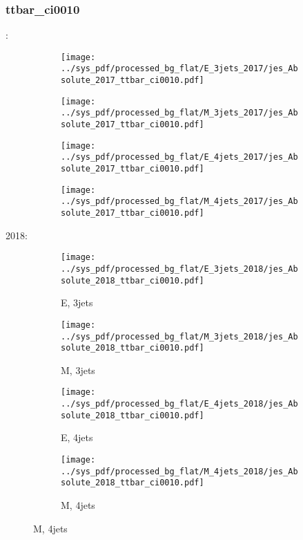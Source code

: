 \documentclass{beamer}
\begin{document}
\begin{frame}
\frametitle{ttbar_ci0010}
\fontsize{5}{1}:
\begin{figure}
\centering
\begin{subfigure}[b]{0.24\textwidth}
\texttt{[image: ../sys\_pdf/processed\_bg\_flat/E\_3jets\_2017/jes\_Absolute\_2017\_ttbar\_ci0010.pdf]}
\end{subfigure}
\begin{subfigure}[b]{0.24\textwidth}
\texttt{[image: ../sys\_pdf/processed\_bg\_flat/M\_3jets\_2017/jes\_Absolute\_2017\_ttbar\_ci0010.pdf]}
\end{subfigure}
\begin{subfigure}[b]{0.24\textwidth}
\texttt{[image: ../sys\_pdf/processed\_bg\_flat/E\_4jets\_2017/jes\_Absolute\_2017\_ttbar\_ci0010.pdf]}
\end{subfigure}
\begin{subfigure}[b]{0.24\textwidth}
\texttt{[image: ../sys\_pdf/processed\_bg\_flat/M\_4jets\_2017/jes\_Absolute\_2017\_ttbar\_ci0010.pdf]}
\end{subfigure}
\end{figure}
2018:
\begin{figure}
\centering
\begin{subfigure}[b]{0.24\textwidth}
\texttt{[image: ../sys\_pdf/processed\_bg\_flat/E\_3jets\_2018/jes\_Absolute\_2018\_ttbar\_ci0010.pdf]}
\captionsetup{font=tiny}
\caption{E, 3jets}
\end{subfigure}
\begin{subfigure}[b]{0.24\textwidth}
\texttt{[image: ../sys\_pdf/processed\_bg\_flat/M\_3jets\_2018/jes\_Absolute\_2018\_ttbar\_ci0010.pdf]}
\captionsetup{font=tiny}
\caption{M, 3jets}
\end{subfigure}
\begin{subfigure}[b]{0.24\textwidth}
\texttt{[image: ../sys\_pdf/processed\_bg\_flat/E\_4jets\_2018/jes\_Absolute\_2018\_ttbar\_ci0010.pdf]}
\captionsetup{font=tiny}
\caption{E, 4jets}
\end{subfigure}
\begin{subfigure}[b]{0.24\textwidth}
\texttt{[image: ../sys\_pdf/processed\_bg\_flat/M\_4jets\_2018/jes\_Absolute\_2018\_ttbar\_ci0010.pdf]}
\captionsetup{font=tiny}
\caption{M, 4jets}
\end{subfigure}
\end{figure}
\end{frame}
\end{document}
